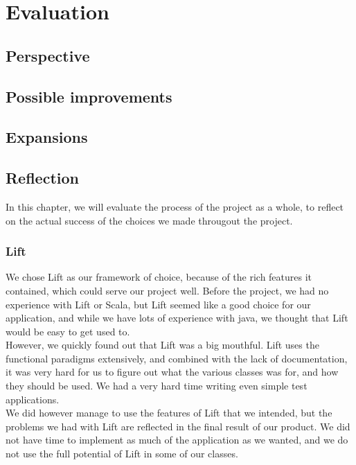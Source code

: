 \chapter{Evaluation}

\section{Perspective}

\section{Possible improvements}

\section{Expansions}

\section{Reflection}
In this chapter, we will evaluate the process of the project as a whole, to reflect on the actual success of the choices we made througout the project.

\subsection{Lift}
We chose Lift as our framework of choice, because of the rich features it contained, which could serve our project well. Before the project, we had no experience with Lift or Scala, but Lift seemed like a good choice for our application, and while we have lots of experience with java, we thought that Lift would be easy to get used to.\\
However, we quickly found out that Lift was a big mouthful. Lift uses the functional paradigms extensively, and combined with the lack of documentation, it was very hard for us to figure out what the various classes was for, and how they should be used. We had a very hard time writing even simple test applications.\\
We did however manage to use the features of Lift that we intended, but the problems we had with Lift are reflected in the final result of our product. We did not have time to implement as much of the application as we wanted, and we do not use the full potential of Lift in some of our classes. \\

